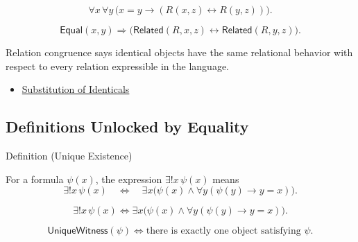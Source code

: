 \begin{remark*}
\[
  \forall x\,\forall y\,
  \bigl(x=y\to(R(x,z)\leftrightarrow R(y,z))\bigr).
\]
\end{remark*}

\begin{remark*}
\[
  \mathsf{Equal}(x,y)\Longrightarrow
  \bigl(\mathsf{Related}(R,x,z)\leftrightarrow\mathsf{Related}(R,y,z)\bigr).
\]
\end{remark*}

\begin{remark*}[Interpretation]
Relation congruence says identical objects have the same relational behavior
with respect to every relation expressible in the language.
\end{remark*}


\begin{dependencies}
\begin{itemize}
  \item \hyperref[ax:axiomatic-equality-substitution]{Substitution of Identicals}
\end{itemize}
\end{dependencies}

\subsection{Definitions Unlocked by Equality}

\begin{definitionbox}{Definition (Unique Existence)}
\begin{definition}\label{def:axiomatic-equality-unique-existence}
For a formula \(\psi(x)\), the expression \(\exists!x\,\psi(x)\) means
\[
  \exists!x\,\psi(x)
  \quad\Longleftrightarrow\quad
  \exists x\bigl(\psi(x)\land
  \forall y(\psi(y)\to y=x)\bigr).
\]
\end{definition}
\end{definitionbox}

\begin{remark*}
\[
  \exists!x\,\psi(x)
  \Longleftrightarrow
  \exists x\bigl(\psi(x)\land
  \forall y(\psi(y)\to y=x)\bigr).
\]
\end{remark*}

\begin{remark*}
\[
  \mathsf{UniqueWitness}(\psi)
  \Longleftrightarrow
  \text{there is exactly one object satisfying }\psi.
\]
\end{remark*}

